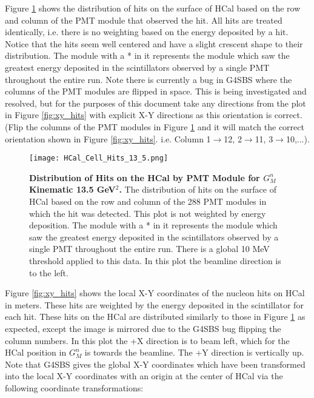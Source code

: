 \documentclass[10pt]{article}
\begin{document}
	Figure \ref{fig:cell_hits} shows the distribution of hits on the surface of HCal based on the row and column of the PMT module that observed the hit. All hits are treated identically, i.e. there is no weighting based on the energy deposited by a hit. Notice that the hits seem well centered and have a slight crescent shape to their distribution. The module with a * in it represents the module which saw the greatest energy deposited in the scintillators observed by a single PMT throughout the entire run. Note there is currently a bug in G4SBS where the columns of the PMT modules are flipped in space. This is being investigated and resolved, but for the purposes of this document take any directions from the plot in Figure \ref{fig:xy_hits} with explicit X-Y directions as this orientation is correct. (Flip the columns of the PMT modules in Figure \ref{fig:cell_hits} and it will match the correct orientation shown in Figure \ref{fig:xy_hits}. i.e. Column 1$\rightarrow$12, 2$\rightarrow$11, 3$\rightarrow$10,...).\\
	
	\begin{figure}[!ht]
	\begin{center}
	\texttt{[image: HCal\_Cell\_Hits\_13\_5.png]}
	\end{center}
	\caption{
	{\bf{Distribution of Hits on the HCal by PMT Module for $G_M^n$ Kinematic 13.5 GeV$^2$.}} The distribution of hits on the surface of HCal based on the row and column of the 288 PMT modules in which the hit was detected. This plot is not weighted by energy deposition. The module with a * in it represents the module which saw the greatest energy deposited in the scintillators observed by a single PMT throughout the entire run. There is a global 10 MeV threshold applied to this data. In this plot the beamline direction is to the left.}
	\label{fig:cell_hits}
	\end{figure}	
	
	Figure \ref{fig:xy_hits} shows the local X-Y coordinates of the nucleon hits on HCal in meters. These hits are weighted by the energy deposited in the scintillator for each hit. These hits on the HCal are distributed similarly to those in Figure \ref{fig:cell_hits} as expected, except the image is mirrored due to the G4SBS bug flipping the column numbers. In this plot the +X direction is to beam left, which for the HCal position in $G_M^n$ is towards the beamline. The +Y direction is vertically up. Note that G4SBS gives the global X-Y coordinates which have been transformed into the local X-Y coordinates with an origin at the center of HCal via the following coordinate transformations:
	
\end{document}
